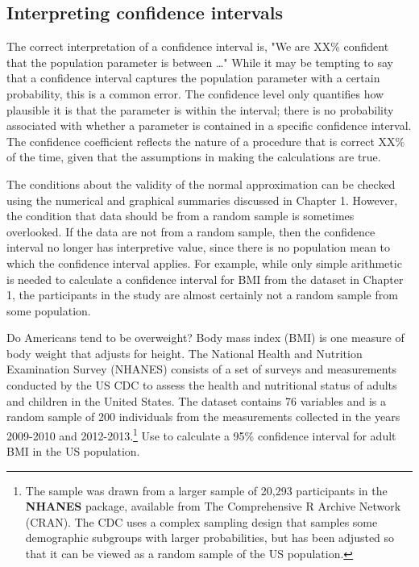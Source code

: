 \begin{spacing}{1.5}

\subsection{Interpreting confidence intervals}
\label{interpretingCIs}


The correct interpretation of a confidence interval is, "We are XX\% confident that the population parameter is between \dots" While it may be tempting to say that a confidence interval captures the population parameter with a certain probability, this is a common error. The confidence level only quantifies how plausible it is that the parameter is within the interval; there is no probability associated with whether a parameter is contained in a specific confidence interval. The confidence coefficient reflects the nature of a procedure that is correct XX\% of the time, given that the assumptions in making the calculations are true.

The conditions about the validity of the normal approximation can be checked using the numerical and graphical summaries discussed in Chapter 1. However, the condition that data should be from a random sample is sometimes overlooked. If the data are not from a random sample, then the confidence interval no longer has interpretive value, since there is no population mean to which the confidence interval applies. For example, while only simple arithmetic is needed to calculate a confidence interval for BMI from the  dataset in Chapter 1, the participants in the study are almost certainly not a random sample from some population.

\begin{example}{Do Americans tend to be overweight? Body mass index (BMI) is one measure of body weight that adjusts for height. The National Health and Nutrition Examination Survey (NHANES) consists of a set of surveys and measurements conducted by the US CDC to assess the health and nutritional status of adults and children in the United States. The dataset  contains 76 variables and is a random sample of 200 individuals from the measurements collected in the years 2009-2010 and 2012-2013.\footnote{The sample was drawn from a larger sample of 20,293 participants in the \textbf{NHANES} package, available from The Comprehensive R Archive Network (CRAN). The CDC uses a complex sampling design that samples some demographic subgroups with larger probabilities, but  has been adjusted so that it can be viewed as a random sample of the US population.} Use  to calculate a 95\% confidence interval for adult BMI in the US population. \label{exNhanesBmi}}
	

\end{example}
\end{spacing}
